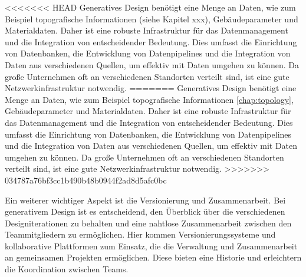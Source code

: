 <<<<<<< HEAD
Generatives Design benötigt eine Menge an Daten, wie zum Beispiel topografische Informationen (siehe Kapitel xxx), Gebäudeparameter und Materialdaten. Daher ist eine robuste Infrastruktur für das Datenmanagement und die Integration von entscheidender Bedeutung. Dies umfasst die Einrichtung von Datenbanken, die Entwicklung von Datenpipelines und die Integration von Daten aus verschiedenen Quellen, um effektiv mit Daten umgehen zu können. Da große Unternehmen oft an verschiedenen Standorten verteilt sind, ist eine gute Netzwer\ac{ki}nfrastruktur notwendig. 
=======
Generatives Design benötigt eine Menge an Daten, wie zum Beispiel topografische Informationen \autoref{chap:topology}, Gebäudeparameter und Materialdaten. Daher ist eine robuste Infrastruktur für das Datenmanagement und die Integration von entscheidender Bedeutung. Dies umfasst die Einrichtung von Datenbanken, die Entwicklung von Datenpipelines und die Integration von Daten aus verschiedenen Quellen, um effektiv mit Daten umgehen zu können. Da große Unternehmen oft an verschiedenen Standorten verteilt sind, ist eine gute Netzwerkinfrastruktur notwendig. 
>>>>>>> 034787a76bf3cc1b490b48b0944f2ad8d5afc0bc

Ein weiterer wichtiger Aspekt ist die Versionierung und Zusammenarbeit. Bei generativem Design ist es entscheidend, den Überblick über die verschiedenen Designiterationen zu behalten und eine nahtlose Zusammenarbeit zwischen den Teammitgliedern zu ermöglichen. Hier kommen Versionierungssysteme und kollaborative Plattformen zum Einsatz, die die Verwaltung und Zusammenarbeit an gemeinsamen Projekten ermöglichen. Diese bieten eine Historie und erleichtern die Koordination zwischen Teams.

